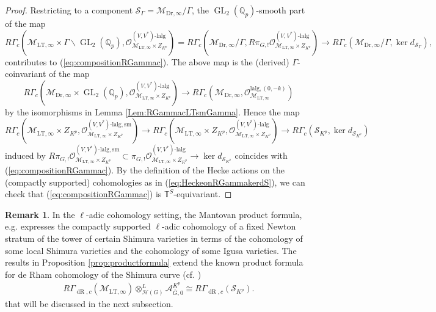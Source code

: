 \documentclass{article}
\theoremstyle{definition}
\newtheorem{remark}[theorem]{Remark}
\def\calA{\mathcal{A}}
\def\calH{\mathcal{H}}
\def\calM{\mathcal{M}}
\def\calO{\mathcal{O}}
\def\calS{\mathcal{S}}
\def\bbQ{\mathbb{Q}}
\def\bbT{\mathbb{T}}
\DeclareMathOperator{\ox}{\otimes}
\def\isom{\cong}
\DeclareMathOperator{\GL}{GL}
\DeclareMathOperator{\dR}{dR}
\def\LT{\mathrm{LT}}
\def\sm{\mathrm{sm}}
\def\lalg{\mathrm{lalg}}
\def\bar{\overline}
\def\-{\text{-}}
\def\-{\text{-}}
\def\Dr{\mathrm{Dr}}
\begin{document}
\begin{proof}
    Restricting to a component $\calS_{\Gamma}=\calM_{\Dr,\infty}/\Gamma$, the $\GL_2(\bbQ_p)$-smooth part of the map 
    \[ R\Gamma_c(\calM_{\LT,\infty}\times \Gamma\backslash \GL_2(\bbQ_p),\calO_{\calM_{\LT,\infty}\times Z_{K^p}}^{(V,V^*)\-\lalg})=R\Gamma_c(\calM_{\Dr,\infty}/\Gamma,R\pi_{G,!}\calO_{\calM_{\LT,\infty}\times Z_{K^p}}^{(V,V^*)\-\lalg})\rightarrow R\Gamma_c(\calM_{\Dr,\infty}/\Gamma,\ker d_{\calS_\Gamma}),\]
    contributes to (\ref{eq:compositionRGammac}). The above map is the (derived) $\Gamma$-coinvariant of the map
    \[R\Gamma_c(\calM_{\Dr,\infty}\times\GL_2(\bbQ_p),\calO_{\calM_{\LT,\infty}\times Z_{K^p}}^{(V,V^*)\-\lalg})\rightarrow R\Gamma_c(\calM_{\Dr,\infty},\calO^{\lalg,(0,-k)}_{\calM_{\LT,\infty}})\] by the isomorphisms in Lemma \ref{Lem:RGammacLTsmGamma}.
    Hence the map
    \[ R\Gamma_c(\calM_{\LT,\infty}\times Z_{K^p},\calO_{\calM_{\LT,\infty}\times Z_{K^p}}^{(V,V^*)\-\lalg,\sm})\rightarrow R\Gamma_c(\calM_{\LT,\infty}\times Z_{K^p},\calO_{\calM_{\LT,\infty}\times Z_{K^p}}^{(V,V^*)\-\lalg})\rightarrow R\Gamma_c(\calS_{K^p},\ker d_{\calS _{K^p}})\]
    induced by $R\pi_{G,!}\calO_{\calM_{\LT,\infty}\times Z_{K^p}}^{(V,V^*)\-\lalg,\sm}\subset \pi_{G,!}\calO_{\calM_{\LT,\infty}\times Z_{K^p}}^{(V,V^*)\-\lalg}\rightarrow \ker d_{\calS_{K^p}}$ coincides with (\ref{eq:compositionRGammac}). By the definition of the Hecke actions on the (compactly supported) cohomologies as in (\ref{eq:HeckeonRGammakerdS}), we can check that (\ref{eq:compositionRGammac}) is $\bbT^{S}$-equivariant. 
\end{proof}


\begin{remark}
In the $\ell$-adic cohomology setting, the Mantovan product formula, e.g. \cite{mantovan2004certain, mantovan2005cohomology, caraiani2017generic, zhang2023peltypeigusastackpadic, daniels2024igusastackscohomologyshimura} expresses the compactly supported $\ell$-adic cohomology of a fixed Newton stratum of the tower of certain Shimura varieties in terms of the cohomology of some local Shimura varieties and the cohomology of some Igusa varieties. The results in Proposition \ref{prop:productformula} extend the known product formula for de Rham cohomology of the Shimura curve (cf. \cite[\S 4.2]{DLB17})
\begin{align*}\label{remarkuniformizationdeRhamcohomology}
    R\Gamma_{\dR,c}(\calM_{\LT,\infty})\ox_{\calH(G)}^L\calA_{\bar G,0}^{K^p}\isom R\Gamma_{\dR,c}(\calS_{K^p}).
\end{align*}
that will be discussed in the next subsection. 
\end{remark}
\end{document}
